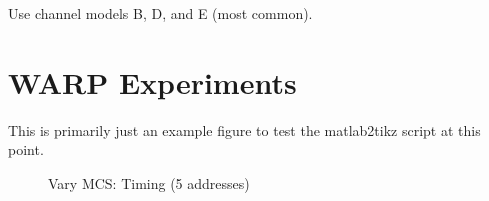 Use channel models B, D, and E (most common).




\section{WARP Experiments}



This is primarily just an example figure to test the matlab2tikz script at this point.\\

\begin{figure}[H]
	\centering
	\setlength\figureheight{5cm}
	\setlength{}
	
	\caption[vary\_mcs-timing-5\_addresses]{Vary MCS: Timing (5 addresses)}
	\label{fig:vary_mcs-timing-5_addresses}
\end{figure}
